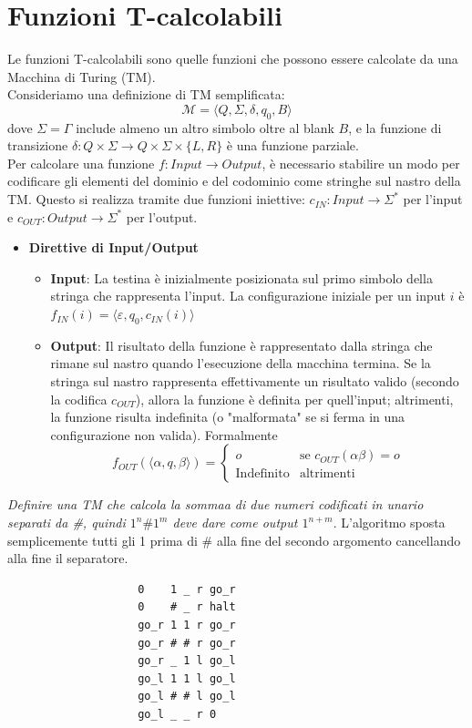 \documentclass[12pt, a4paper]{report}
\begin{document}
        \section{Funzioni T-calcolabili}
            Le funzioni T-calcolabili sono quelle funzioni che possono essere calcolate da una Macchina di Turing (TM).\\
            Consideriamo una definizione di TM semplificata: 
            $$\mathcal{M}=\langle Q,\Sigma,\delta,q_0,B\rangle$$
            dove $\Sigma=\Gamma$ include almeno un altro simbolo oltre al blank $B$, e la funzione di transizione $\delta : Q \times \Sigma \to Q \times \Sigma \times \{L,R\}$ è una funzione parziale.\\
            Per calcolare una funzione $f : Input \to Output$, è necessario stabilire un modo per codificare gli elementi del dominio e del codominio come stringhe sul nastro della TM. Questo si realizza tramite due funzioni iniettive: $c_{IN} : Input \to \Sigma^*$ per l'input e $c_{OUT} : Output \to \Sigma^*$ per l'output.
            \begin{itemize}
                \item \textbf{Direttive di Input/Output} \begin{itemize}
                    \item \textbf{Input}: La testina è inizialmente posizionata sul primo simbolo della stringa che rappresenta l'input. La configurazione iniziale per un input $i$ è $f_{IN}(i) = \langle \varepsilon, q_0, c_{IN}(i) \rangle$
                    \item \textbf{Output}: Il risultato della funzione è rappresentato dalla stringa che rimane sul nastro quando l'esecuzione della macchina termina. Se la stringa sul nastro rappresenta effettivamente un risultato valido (secondo la codifica $c_{OUT}$), allora la funzione è definita per quell'input; altrimenti, la funzione risulta indefinita (o "malformata" se si ferma in una configurazione non valida). Formalmente $$f_{OUT}(\langle\alpha,q,\beta\rangle)=\begin{cases}
                        o & \text{se } c_{OUT}(\alpha\beta)=o\\
                        \text{Indefinito} & \text{altrimenti}
                    \end{cases}$$
                \end{itemize}
            \end{itemize}
            \begin{example}
                \textit{Definire una TM che calcola la sommaa di due numeri codificati in unario separati da \#, quindi $1^n\#1^m$ deve dare come output $1^{n+m}$}. L'algoritmo sposta semplicemente tutti gli 1 prima di \# alla fine del secondo argomento cancellando alla fine il separatore.
                \begin{verbatim}
                    0    1 _ r go_r
                    0    # _ r halt
                    go_r 1 1 r go_r
                    go_r # # r go_r
                    go_r _ 1 l go_l
                    go_l 1 1 l go_l
                    go_l # # l go_l
                    go_l _ _ r 0
                \end{verbatim}
            \end{example}
\end{document}
